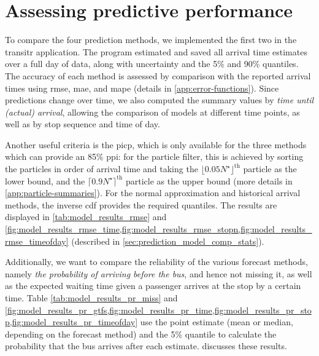 \section{Assessing predictive performance}
\label{sec:prediction_model_comparison}

To compare the four prediction methods, we implemented the first two in the \textsf{transitr} application. The program estimated and saved all arrival time estimates over a full day of data, along with uncertainty and the 5\% and 90\% quantiles. The accuracy of each method is assessed by comparison with the reported arrival times using \gls{rmse}, \gls{mae}, and \gls{mape} (details in \cref{app:error-functions}). Since predictions change over time, we also computed the summary values by \emph{time until (actual) arrival}, allowing the comparison of models at different time points, as well as by stop sequence and time of day.


Another useful criteria is the \gls{picp}, which is only available for the three methods which can provide an 85\% \gls{ppi}: for the particle filter, this is achieved by sorting the particles in order of arrival time and taking the $\lfloor 0.05 N^\star\rfloor^{\text{th}}$ particle as the lower bound, and the $\lceil 0.9 N^\star\rceil^{\text{th}}$ particle as the upper bound (more details in \cref{app:particle-summaries}). For the normal approximation and historical arrival methods, the inverse \gls{cdf} provides the required quantiles. The results are displayed in \cref{tab:model_results_rmse} and \cref{fig:model_results_rmse_time,fig:model_results_rmse_stopn,fig:model_results_rmse_timeofday} (described in \cref{sec:prediction_model_comp_stats}).


Additionally, we want to compare the reliability of the various forecast methods, namely \emph{the probability of arriving before the bus}, and hence not missing it, as well as the expected waiting time given a passenger arrives at the stop by a certain time. Table \cref{tab:model_results_pr_miss} and \cref{fig:model_results_pr_gtfs,fig:model_results_pr_time,fig:model_results_pr_stop,fig:model_results_pr_timeofday} use the point estimate (mean or median, depending on the forecast method) and the 5\% quantile to calculate the probability that the bus arrives after each estimate.  discusses these results.





